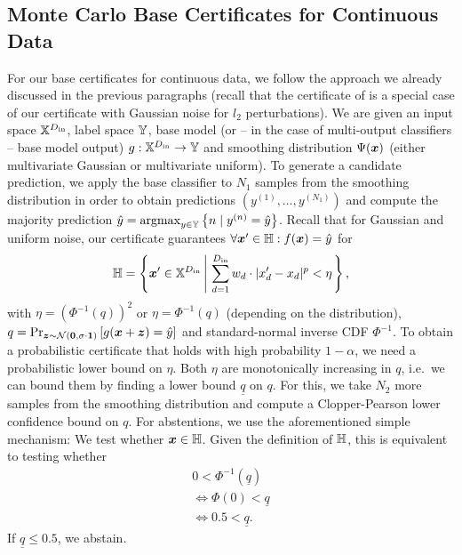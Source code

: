 \subsection{Monte Carlo Base Certificates for Continuous Data}\label{section:monte_carlo_continuous}
For our base certificates for continuous data, we follow the approach we already discussed in the previous paragraphs (recall that the certificate of \citet{Cohen2019} is a special case of our certificate with Gaussian noise for $l_2$ perturbations).
We are given an input space ${\mathbb{X}}^{D_\mathrm{in}}$, label space ${\mathbb{Y}}$, base model (or -- in the case of multi-output classifiers -- base model output) $g : {\mathbb{X}}^{D_\mathrm{in}} \rightarrow {\mathbb{Y}}$ and smoothing distribution $\Psi({\bm{x}})$ (either multivariate Gaussian or multivariate uniform).
To generate a candidate prediction, we apply the base classifier to $N_1$ samples from the smoothing distribution in order to obtain predictions $\left(y^{(1)},\dots,y^{(N_1)}\right)$ and compute the majority prediction
$\hat{y} = \mathrm{argmax}_{y \in {\mathbb{Y}}} \left\{ n \mid y^{(n)} = \hat{y} \right\}$.
Recall that for Gaussian and uniform noise, our certificate guarantees $\forall {\bm{x}}' \in {\mathbb{H}} : f({\bm{x}}) = \hat{y}$ for
\begin{equation*}
    {\mathbb{H}} = \left\{{\bm{x}}' \in {\mathbb{X}}^{D_\mathrm{in}}
    \left| \
    \sum_{d=1}^{D_\mathrm{in}}
        {w}_{d} \cdot |{x}'_d - {x}_d|^p < \eta
        \right.
    \right\},
\end{equation*}
with $\eta = \left(\Phi^{-1}(q) \right)^2$ or $\eta = \Phi^{-1}(q)$ (depending on the distribution), $q = \Pr_{{\bm{z}} \sim \mathcal{N}(\mathbf{0}, \sigma \cdot \bm{1})}\left[g({\bm{x}} + {\bm{z}}) = \hat{y}\right]$ and standard-normal inverse CDF $\Phi^{-1}$.
To obtain a probabilistic certificate that holds with high probability $1 - \alpha$, we need a probabilistic lower bound on $\eta$.
Both $\eta$ are monotonically increasing in $q$, i.e.~we can bound them by finding a lower bound $\underline{q}$ on $q$.
For this, we take $N_2$ more samples from the smoothing distribution and compute a Clopper-Pearson lower confidence bound \citep{Clopper1934} on $q$.
For abstentions, we use the aforementioned simple mechanism: We test whether ${\bm{x}} \in {\mathbb{H}}$. Given the definition of ${\mathbb{H}}$, this is equivalent to testing whether
\begin{gather*}
    0 < \Phi^{-1}(\underline{q})
    \\
    \iff
    \Phi(0) < \underline{q}
    \\
    \iff 0.5 < \underline{q}.
\end{gather*}
If $\underline{q} \leq 0.5$, we abstain.

